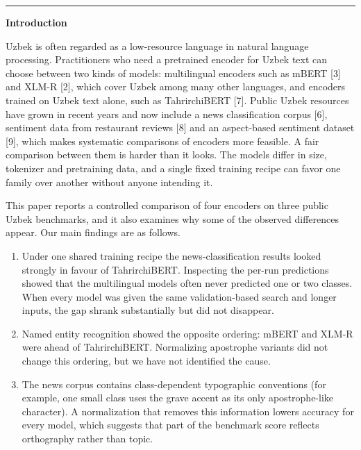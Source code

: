 \documentclass[11pt]{book}
\begin{document}
\noindent\rule{\linewidth}{1.0 pt}

\vspace{0.3cm}

\label{firstpage}

\begin{center}
\textbf{Introduction}
\end{center}

Uzbek is often regarded as a low-resource language in natural language processing. Practitioners who need a pretrained encoder for Uzbek text can choose between two kinds of models: multilingual encoders such as mBERT [3] and XLM-R [2], which cover Uzbek among many other languages, and encoders trained on Uzbek text alone, such as TahrirchiBERT [7]. Public Uzbek resources have grown in recent years and now include a news classification corpus [6], sentiment data from restaurant reviews [8] and an aspect-based sentiment dataset [9], which makes systematic comparisons of encoders more feasible. A fair comparison between them is harder than it looks. The models differ in size, tokenizer and pretraining data, and a single fixed training recipe can favor one family over another without anyone intending it.

This paper reports a controlled comparison of four encoders on three public Uzbek benchmarks, and it also examines why some of the observed differences appear. Our main findings are as follows.

\begin{enumerate}
\item Under one shared training recipe the news-classification results looked strongly in favour of TahrirchiBERT. Inspecting the per-run predictions showed that the multilingual models often never predicted one or two classes. When every model was given the same validation-based search and longer inputs, the gap shrank substantially but did not disappear.
\item Named entity recognition showed the opposite ordering: mBERT and XLM-R were ahead of TahrirchiBERT. Normalizing apostrophe variants did not change this ordering, but we have not identified the cause.
\item The news corpus contains class-dependent typographic conventions (for example, one small class uses the grave accent as its only apostrophe-like character). A normalization that removes this information lowers accuracy for every model, which suggests that part of the benchmark score reflects orthography rather than topic.
\end{enumerate}
\end{document}
